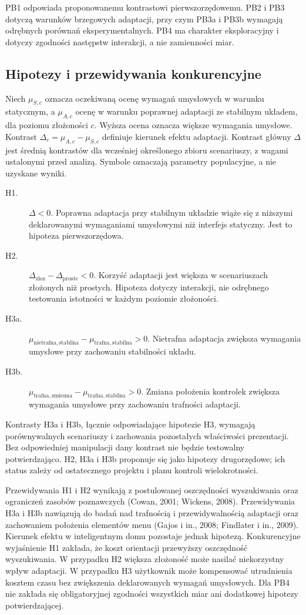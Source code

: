 \documentclass[11pt,a4paper]{article}
\begin{document}
PB1 odpowiada proponowanemu kontrastowi pierwszorzędowemu. PB2 i PB3 dotyczą warunków brzegowych adaptacji, przy czym PB3a i PB3b wymagają odrębnych porównań eksperymentalnych. PB4 ma charakter eksploracyjny i dotyczy zgodności następstw interakcji, a nie zamienności miar.

\subsection{Hipotezy i przewidywania konkurencyjne}

Niech $\mu_{S,c}$ oznacza oczekiwaną ocenę wymagań umysłowych w warunku statycznym, a $\mu_{A,c}$ ocenę w warunku poprawnej adaptacji ze stabilnym układem, dla poziomu złożoności $c$. Wyższa ocena oznacza większe wymagania umysłowe. Kontrast $\Delta_c=\mu_{A,c}-\mu_{S,c}$ definiuje kierunek efektu adaptacji. Kontrast główny $\Delta$ jest średnią kontrastów dla wcześniej określonego zbioru scenariuszy, z wagami ustalonymi przed analizą. Symbole oznaczają parametry populacyjne, a nie uzyskane wyniki.

\begin{description}
\item[H1.] $\Delta<0$. Poprawna adaptacja przy stabilnym układzie wiąże się z niższymi deklarowanymi wymaganiami umysłowymi niż interfejs statyczny. Jest to hipoteza pierwszorzędowa.
\item[H2.] $\Delta_{\mathrm{zloz}}-\Delta_{\mathrm{proste}}<0$. Korzyść adaptacji jest większa w scenariuszach złożonych niż prostych. Hipoteza dotyczy interakcji, nie odrębnego testowania istotności w każdym poziomie złożoności.
\item[H3a.] $\mu_{\mathrm{nietrafna,stabilna}}-\mu_{\mathrm{trafna,stabilna}}>0$. Nietrafna adaptacja zwiększa wymagania umysłowe przy zachowaniu stabilności układu.
\item[H3b.] $\mu_{\mathrm{trafna,zmienna}}-\mu_{\mathrm{trafna,stabilna}}>0$. Zmiana położenia kontrolek zwiększa wymagania umysłowe przy zachowaniu trafności adaptacji.
\end{description}

Kontrasty H3a i H3b, łącznie odpowiadające hipotezie H3, wymagają porównywalnych scenariuszy i zachowania pozostałych właściwości prezentacji. Bez odpowiedniej manipulacji dany kontrast nie będzie testowalny potwierdzająco. H2, H3a i H3b proponuje się jako hipotezy drugorzędowe; ich status zależy od ostatecznego projektu i planu kontroli wielokrotności.

Przewidywania H1 i H2 wynikają z postulowanej oszczędności wyszukiwania oraz ograniczeń zasobów poznawczych (Cowan, 2001; Wickens, 2008). Przewidywania H3a i H3b nawiązują do badań nad trafnością i przewidywalnością adaptacji oraz zachowaniem położenia elementów menu (Gajos i in., 2008; Findlater i in., 2009). Kierunek efektu w inteligentnym domu pozostaje jednak hipotezą. Konkurencyjne wyjaśnienie H1 zakłada, że koszt orientacji przewyższy oszczędność wyszukiwania. W przypadku H2 większa złożoność może nasilać niekorzystny wpływ adaptacji. W przypadku H3 użytkownik może kompensować utrudnienia kosztem czasu bez zwiększenia deklarowanych wymagań umysłowych. Dla PB4 nie zakłada się obligatoryjnej zgodności wszystkich miar ani dodatkowej hipotezy potwierdzającej.
\end{document}
